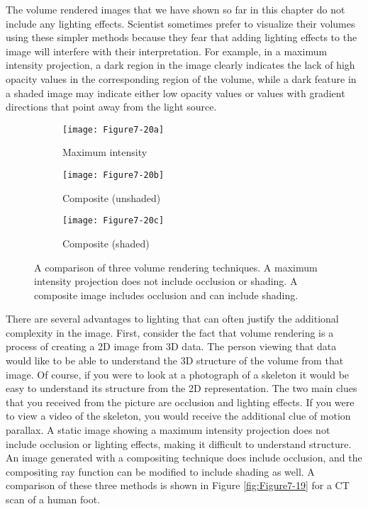 The volume rendered images that we have shown so far in this chapter do not include any lighting effects. Scientist sometimes prefer to visualize their volumes using these simpler methods because they fear that adding lighting effects to the image will interfere with their interpretation. For example, in a maximum intensity projection, a dark region in the image clearly indicates the lack of high opacity values in the corresponding region of the volume, while a dark feature in a shaded image may indicate either low opacity values or values with gradient directions that point away from the light source.

\begin{figure}[!htb]
	\begin{subfigure}[h]{0.32\linewidth}
		\texttt{[image: Figure7-20a]}
		\caption*{Maximum intensity}\label{fig:Figure7-20a}
	\end{subfigure}
	\hfill
	\begin{subfigure}[h]{0.32\linewidth}
		\texttt{[image: Figure7-20b]}
		\caption*{Composite (unshaded)}\label{fig:Figure7-20b}
	\end{subfigure}%
	\hfill
	\begin{subfigure}[h]{0.32\linewidth}
		\texttt{[image: Figure7-20c]}
		\caption*{Composite (shaded)}\label{fig:Figure7-20c}
	\end{subfigure}%
	\caption{A comparison of three volume rendering techniques. A maximum intensity projection does not include occlusion or shading. A composite image includes occlusion and can include shading.}\label{fig:Figure7-20}
\end{figure}

There are several advantages to lighting that can often justify the additional complexity in the image. First, consider the fact that volume rendering is a process of creating a 2D image from 3D data. The person viewing that data would like to be able to understand the 3D structure of the volume from that image. Of course, if you were to look at a photograph of a skeleton it would be easy to understand its structure from the 2D representation. The two main clues that you received from the picture are occlusion and lighting effects. If you were to view a video of the skeleton, you would receive the additional clue of motion parallax. A static image showing a maximum intensity projection does not include occlusion or lighting effects, making it difficult to understand structure. An image generated with a compositing technique does include occlusion, and the compositing ray function can be modified to include shading as well. A comparison of these three methods is shown in Figure \ref{fig:Figure7-19} for a CT scan of a human foot.

